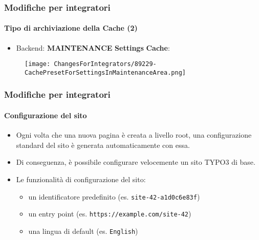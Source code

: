 \begin{frame}[fragile]
	\frametitle{Modifiche per integratori}
	\framesubtitle{Tipo di archiviazione della Cache (2)}

	\begin{itemize}

		\item Backend: \textbf{MAINTENANCE} \hspace{0.1cm}\textbf{Settings} \hspace{0.1cm}\textbf{Cache}:
		\end{itemize}

	\begin{figure}
		\texttt{[image: ChangesForIntegrators/89229-CachePresetForSettingsInMaintenanceArea.png]}
	\end{figure}

\end{frame}


\begin{frame}[fragile]
	\frametitle{Modifiche per integratori}
	\framesubtitle{Configurazione del sito}

	\begin{itemize}
		\item Ogni volta che una nuova pagina è creata a livello root, una configurazione
			standard del sito è generata automaticamente con essa.
		\item Di conseguenza, è possibile configurare velocemente un sito TYPO3 di base.
		\item Le funzionalità di configurazione del sito:

			\begin{itemize}
				\item un identificatore predefinito (es. \texttt{site-42-a1d0c6e83f})
				\item un entry point (es. \texttt{https://example.com/site-42})
				\item una lingua di default (es. \texttt{English})
			\end{itemize}

	\end{itemize}

\end{frame}


